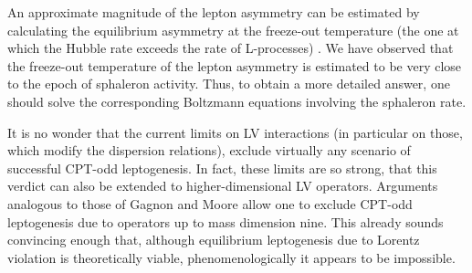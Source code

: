 \documentclass[12pt]{revtex4}
\begin{document}
	An approximate magnitude of the lepton asymmetry can be estimated by calculating
	the equilibrium asymmetry at the freeze-out temperature (the one at which the
	Hubble rate exceeds the rate of L-processes)
\cite{Bertolami:1996cq}.
	We have observed that the freeze-out temperature of the lepton asymmetry is
	estimated to be very close to the epoch of sphaleron activity.
	Thus, to obtain a more detailed answer, one should solve the corresponding 
	Boltzmann equations involving the sphaleron rate.

	It is no wonder that the current limits on LV interactions (in particular on those,
	which modify the dispersion relations), exclude virtually any scenario of successful
	CPT-odd leptogenesis.
	In fact, these limits are so strong, that this verdict can also be extended to 
	higher-dimensional LV operators.
	Arguments analogous to those of Gagnon and Moore
\cite{Gagnon:2004xh} 
	allow one to exclude CPT-odd
	leptogenesis due to operators up to mass dimension nine.
	This already sounds convincing enough that, although equilibrium leptogenesis
	due to Lorentz violation is theoretically viable, phenomenologically it appears
	to be impossible.




\end{document}
